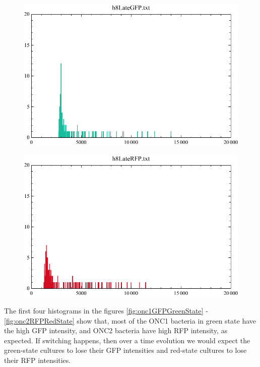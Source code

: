 \documentclass[english,11pt,a4paper]{article}
\begin{document}
\begin{figure}[h]
\centering
	\begin{minipage}{.5\textwidth}
  		\centering
  		\includegraphics[width=.9\linewidth]{h8LateGFP.pdf}
  		\label{fig:onc2GFPAfterHours}
	\end{minipage}%
	\begin{minipage}{.5\textwidth}
  		\centering
  		\includegraphics[width=.9\linewidth]{h8LateRFP.pdf}
  		\label{fig:onc2RFPAfterHours}  
	\end{minipage}
\end{figure}

The first four histograms in the figures \ref{fig:onc1GFPGreenState} - \ref{fig:onc2RFPRedState} show that, most of the  ONC1 bacteria in green state have the high GFP intensity, and ONC2 bacteria have high RFP intensity, as expected. If switching happens, then over a time evolution we would expect the green-state cultures to lose their GFP intensities and red-state cultures to lose their RFP intensities.
\end{document}
